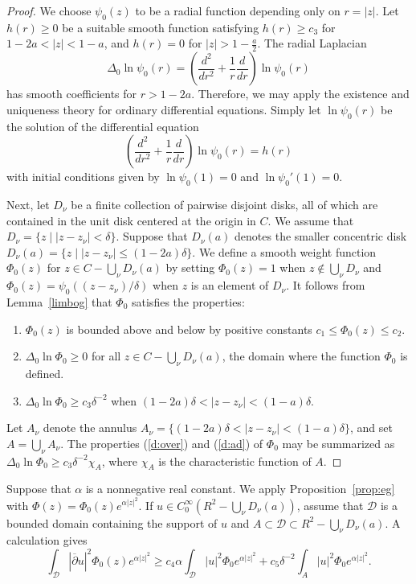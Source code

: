\documentclass{article}
\theoremstyle{definition}
\theoremstyle{remark}
\newcommand{\lemref}[1]{Lemma~\ref{#1}}
\newcommand{\envert}[1]{\left\lvert#1\right\rvert}
\let\abs=\envert
\begin{document}
\begin{proof}
We choose $\psi_0(z)$ to be a radial function depending only on $r=\abs{z}$.
Let $h(r)\geq 0$ be a suitable smooth function satisfying $h(r)\geq c_3$
for $1-2a<\abs{z}<1-a$, and $h(r)=0$ for $\abs{z}>1-\tfrac a2$. The radial
Laplacian
\[\Delta_0\ln\psi_0(r)=\left(\frac {d^2}{dr^2}+\frac
1r\frac d{dr}\right)\ln\psi_0(r)\]
has smooth coefficients for $r>1-2a$. Therefore, we may
apply the existence and uniqueness theory for ordinary differential
equations. Simply let $\ln \psi_0(r)$ be the solution of the differential
equation
\[\left(\frac{d^2}{dr^2}+\frac 1r\frac d{dr}\right)\ln \psi_0(r)=h(r)\]
with initial conditions given by $\ln \psi_0(1)=0$ and
$\ln\psi_0'(1)=0$.

Next, let $D_\nu$ be a finite collection of pairwise disjoint disks,
all of which are contained in the unit disk centered at the origin in
$C$. We assume that $D_\nu=\{z\mid \abs{z-z_\nu}<\delta\}$. Suppose that
$D_\nu(a)$ denotes the smaller concentric disk $D_\nu(a)=\{z\mid
\abs{z-z_\nu}\leq (1-2a)\delta\}$. We define a smooth weight function
$\Phi_0(z)$ for $z\in C-\bigcup_\nu D_\nu(a)$ by setting $\Phi_
0(z)=1$ when $z\notin \bigcup_\nu D_\nu$ and $\Phi_
0(z)=\psi_0((z-z_\nu)/\delta)$ when $z$ is an element of $D_\nu$. It
follows from \lemref{limbog} that $\Phi_ 0$ satisfies the properties:
\begin{enumerate}
\renewcommand{\labelenumi}{(\roman{enumi})}
\item \label{boundab}$\Phi_ 0(z)$ is bounded above and below by
positive constants $c_1\leq \Phi_ 0(z)\leq c_2$.
\item \label{d:over}$\Delta_0\ln\Phi_ 0\geq 0$ for all
$z\in C-\bigcup_\nu D_\nu(a)$,
the domain where the function $\Phi_ 0$ is defined.
\item \label{d:ad}$\Delta_0\ln\Phi_ 0\geq c_3\delta^{-2}$
when $(1-2a)\delta<\abs{z-z_\nu}<(1-a)\delta$.
\end{enumerate}
Let $A_\nu$ denote the annulus $A_\nu=\{(1-2a)\delta<\abs{z-z_\nu}<(1-a)
\delta \}$, and set $A=\bigcup_\nu A_\nu$. The
properties (\ref{d:over}) and (\ref{d:ad}) of $\Phi_ 0$
may be summarized as $\Delta_0\ln \Phi_ 0\geq c_3\delta^{-2}\chi_A$,
where $\chi _A$ is the characteristic function of $A$.
\end{proof}

Suppose that $\alpha$ is a nonnegative real constant. We apply
Proposition~\ref{prop:eg} with $\Phi(z)=\Phi_ 0(z) e^{\alpha\abs{z}^2}$. If
$u\in C^\infty_0(R^2-\bigcup_\nu D_\nu(a))$, assume that $\mathcal{D}$
is a bounded domain containing the support of $u$ and $A\subset
\mathcal{D}\subset R^2-\bigcup_\nu D_\nu(a)$. A calculation gives
\[\int_{\mathcal{D}}\abs{\overline\partial u}^2\Phi_ 0(z) e^{\alpha\abs{z}^2}
\geq c_4\alpha\int_{\mathcal{D}}\abs{u}^2\Phi_ 0e^{\alpha\abs{z}^2}
+c_5\delta^{-2}\int_ A\abs{u}^2\Phi_ 0e^{\alpha\abs{z}^2}.\]
\end{document}
